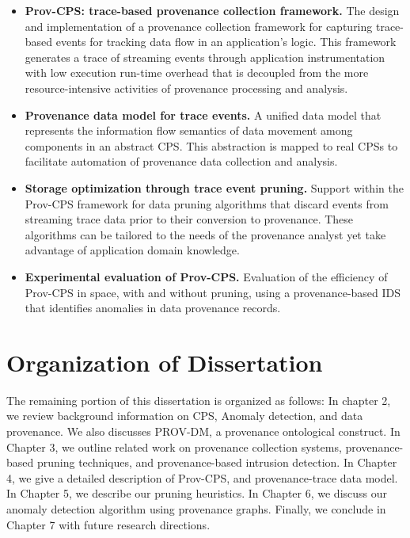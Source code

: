 \begin{itemize}

\item \textbf{Prov-CPS: trace-based provenance collection framework.} The design and implementation of a provenance collection framework for capturing trace-based events for tracking data flow in an application's logic. This framework generates a trace of streaming events through application instrumentation with low execution run-time overhead that is decoupled from the more resource-intensive activities of provenance processing and analysis.

\item \textbf{Provenance data model for trace events.} A unified data model that represents the information flow semantics of data movement among components in an abstract CPS. This abstraction is mapped to real CPSs to facilitate automation of provenance data collection and analysis.

\item \textbf{Storage optimization through trace event pruning.} Support within the Prov-CPS framework for data pruning algorithms that discard events from streaming trace data prior to their conversion to provenance. These algorithms can be tailored to the needs of the provenance analyst yet take advantage of application domain knowledge.

\item \textbf{Experimental evaluation of Prov-CPS.} Evaluation of the efficiency of Prov-CPS in space, with and without pruning, using a provenance-based IDS that identifies anomalies in data provenance records.



\end{itemize}

\section{Organization of Dissertation}

The remaining portion of this dissertation is organized as follows: In chapter 2, we review background information on CPS, Anomaly detection, and data provenance. We also discusses PROV-DM, a provenance ontological construct. In Chapter 3, we outline related work on provenance collection systems, provenance-based pruning techniques, and provenance-based intrusion detection. In Chapter 4, we give a detailed description of Prov-CPS, and provenance-trace data model. In Chapter 5, we describe our pruning heuristics. In Chapter 6, we discuss our anomaly detection algorithm using provenance graphs. Finally, we conclude in Chapter 7 with future research directions.

